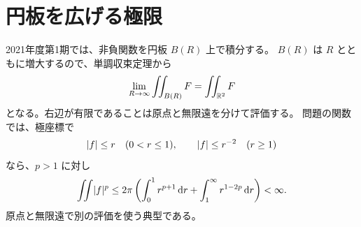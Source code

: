 \section{円板を広げる極限}

2021年度第1期では、非負関数を円板 $B(R)$ 上で積分する。
$B(R)$ は $R$ とともに増大するので、単調収束定理から
\[
\lim_{R\to\infty}\iint_{B(R)}F
=\iint_{\mathbb{R}^2}F
\]
となる。右辺が有限であることは原点と無限遠を分けて評価する。
問題の関数では、極座標で
\[
\lvert f \rvert\le r\quad(0<r\le1),\qquad
\lvert f \rvert\le r^{-2}\quad(r\ge1)
\]
なら、$p>1$ に対し
\[
\iint\lvert f \rvert^p
\le2\pi\left(\int_0^1r^{p+1}\,\mathrm{d} r+\int_1^\infty r^{1-2p}\,\mathrm{d} r\right)<\infty.
\]
原点と無限遠で別の評価を使う典型である。
